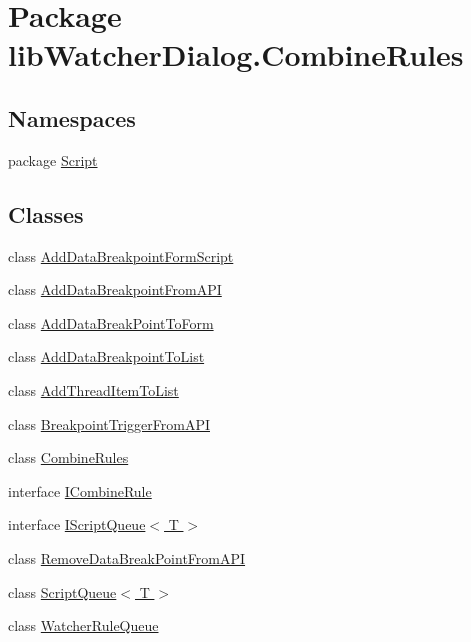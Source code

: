 \hypertarget{namespacelib_watcher_dialog_1_1_combine_rules}{\section{Package lib\+Watcher\+Dialog.\+Combine\+Rules}
\label{namespacelib_watcher_dialog_1_1_combine_rules}
}
\subsection*{Namespaces}
\begin{DoxyCompactItemize}
\item 
package \hyperlink{namespacelib_watcher_dialog_1_1_combine_rules_1_1_script}{Script}
\end{DoxyCompactItemize}
\subsection*{Classes}
\begin{DoxyCompactItemize}
\item 
class \hyperlink{classlib_watcher_dialog_1_1_combine_rules_1_1_add_data_breakpoint_form_script}{Add\+Data\+Breakpoint\+Form\+Script}
\item 
class \hyperlink{classlib_watcher_dialog_1_1_combine_rules_1_1_add_data_breakpoint_from_a_p_i}{Add\+Data\+Breakpoint\+From\+A\+P\+I}
\item 
class \hyperlink{classlib_watcher_dialog_1_1_combine_rules_1_1_add_data_break_point_to_form}{Add\+Data\+Break\+Point\+To\+Form}
\item 
class \hyperlink{classlib_watcher_dialog_1_1_combine_rules_1_1_add_data_breakpoint_to_list}{Add\+Data\+Breakpoint\+To\+List}
\item 
class \hyperlink{classlib_watcher_dialog_1_1_combine_rules_1_1_add_thread_item_to_list}{Add\+Thread\+Item\+To\+List}
\item 
class \hyperlink{classlib_watcher_dialog_1_1_combine_rules_1_1_breakpoint_trigger_from_a_p_i}{Breakpoint\+Trigger\+From\+A\+P\+I}
\item 
class \hyperlink{classlib_watcher_dialog_1_1_combine_rules_1_1_combine_rules}{Combine\+Rules}
\item 
interface \hyperlink{interfacelib_watcher_dialog_1_1_combine_rules_1_1_i_combine_rule}{I\+Combine\+Rule}
\item 
interface \hyperlink{interfacelib_watcher_dialog_1_1_combine_rules_1_1_i_script_queue_3_01_t_01_4}{I\+Script\+Queue$<$ T $>$}
\item 
class \hyperlink{classlib_watcher_dialog_1_1_combine_rules_1_1_remove_data_break_point_from_a_p_i}{Remove\+Data\+Break\+Point\+From\+A\+P\+I}
\item 
class \hyperlink{classlib_watcher_dialog_1_1_combine_rules_1_1_script_queue_3_01_t_01_4}{Script\+Queue$<$ T $>$}
\item 
class \hyperlink{classlib_watcher_dialog_1_1_combine_rules_1_1_watcher_rule_queue}{Watcher\+Rule\+Queue}
\end{DoxyCompactItemize}
